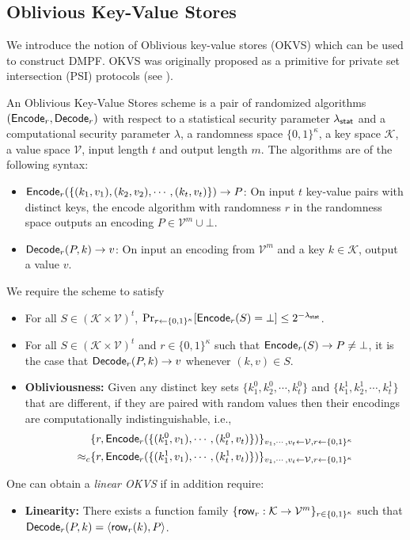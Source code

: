 \subsection{Oblivious Key-Value Stores}
We introduce the notion of Oblivious key-value stores (OKVS) which can be used to construct DMPF. OKVS was originally proposed as a primitive for private set intersection (PSI) protocols (see \cite{cryptoeprint:2021/883,cryptoeprint:2022/320}). 
\begin{definition}\label{def:OKVS}
  An Oblivious Key-Value Stores scheme is a pair of randomized algorithms $({\sf Encode}_r,{\sf Decode}_r)$ with respect to a statistical security parameter $\lambda_{\sf stat}$ and a computational security parameter $\lambda$, a randomness space $\{0,1\}^\kappa$, a key space $\mathcal{K}$, a value space $\mathcal{V}$, input length $t$ and output length $m$. The algorithms are of the following syntax: 
  \begin{itemize}
    \item ${\sf Encode}_r(\{(k_1,v_1),(k_2,v_2),\cdots,(k_t,v_t)\})\rightarrow P$: On input $t$ key-value pairs with distinct keys, the encode algorithm with randomness $r$ in the randomness space outputs an encoding $P\in\mathcal{V}^m\cup\bot$.
    \item ${\sf Decode}_r(P,k)\rightarrow v$: On input an encoding from $\mathcal{V}^m$ and a key $k\in\mathcal{K}$, output a value $v$. 
  \end{itemize}
  We require the scheme to satisfy
  \begin{itemize}
    \item For all $S\in(\mathcal{K}\times\mathcal{V})^t$, $\Pr_{r\leftarrow\{0,1\}^\kappa}[{\sf Encode}_r(S)=\bot]\le 2^{-\lambda_{\sf stat}}$. 
    \item For all $S\in(\mathcal{K}\times \mathcal{V})^t$ and $r\in \{0,1\}^\kappa$ such that ${\sf Encode}_r(S)\rightarrow P\not=\bot$, it is the case that ${\sf Decode}_r(P,k)\rightarrow v$ whenever $(k,v)\in S$. 
    \item \textbf{Obliviousness: }Given any distinct key sets $\{k_1^0,k_2^0,\cdots,k_t^0\}$ and $\{k_1^1,k_2^1,\cdots,k_t^1\}$ that are different, if they are paired with random values then their encodings are computationally indistinguishable, i.e., 
  \begin{align*}
    &\{r, {\sf Encode}_r(\{(k_1^0,v_1),\cdots,(k_t^0,v_t)\})\}_{v_1,\cdots,v_t\leftarrow \mathcal{V},r\leftarrow\{0,1\}^\kappa}\\
    \approx_c &\{r, {\sf Encode}_r(\{(k_1^1,v_1),\cdots,(k_t^1,v_t)\})\}_{v_1,\cdots,v_t\leftarrow \mathcal{V},r\leftarrow\{0,1\}^\kappa}
  \end{align*}
  \end{itemize}
One can obtain a \emph{linear OKVS} if in addition require:
\begin{itemize}
  \item \textbf{Linearity: }There exists a function family $\{{\sf row}_r:\mathcal{K}\rightarrow\mathcal{V}^m\}_{r\in\{0,1\}^\kappa}$ such that ${\sf Decode}_r(P,k) = \langle {\sf row}_r(k), P \rangle$. 
\end{itemize}
\end{definition}
